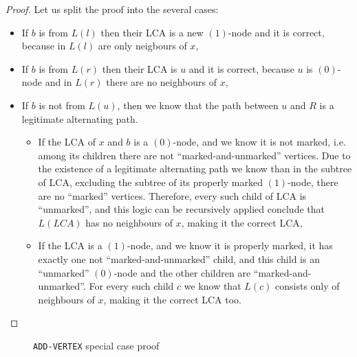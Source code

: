 \begin{proof}
Let us split the proof into the several cases:
        \begin{itemize}
            \item If $b$ is from $L(l)$ then their LCA is a new $(1)$-node and it is correct, because in $L(l)$ are only neigbours of $x$,
            \item If $b$ is from $L(r)$ then their LCA is $u$ and it is correct, because $u$ is $(0)$-node and in $L(r)$ there are no neighbours of $x$,
        \item If $b$ is not from $L(u)$, then we know that the path between $u$ and $R$ is a legitimate alternating path. 
        \begin{itemize}
            \item If the LCA of $x$ and $b$ is a $(0)$-node, and we know it is not marked, i.e. among its children there are not ``marked-and-unmarked'' vertices. Due to the existence of a legitimate alternating path we know than in the subtree of LCA,  excluding the subtree of its properly marked $(1)$-node, there are no ``marked'' vertices.  Therefore, every such child of LCA is ``unmarked'', and this logic can be recursively applied conclude that $L(LCA)$ has no neighbours of $x$, making it the correct LCA,
            \item If the LCA is a $(1)$-node, and we know it is properly marked, it has exactly one not ``marked-and-unmarked'' child, and this child is an ``unmarked'' $(0)$-node and the other children are ``marked-and-unmarked''. For every such child $c$ we know that $L(c)$ consists only of neighbours of $x$, making it the correct LCA too.
        \end{itemize}
        \end{itemize}
\end{proof}
        
\begin{figure}
    \centering
    
    \caption{\texttt{ADD-VERTEX} special case proof}
    \label{fig:ADD-VERTEX}
\end{figure}        

